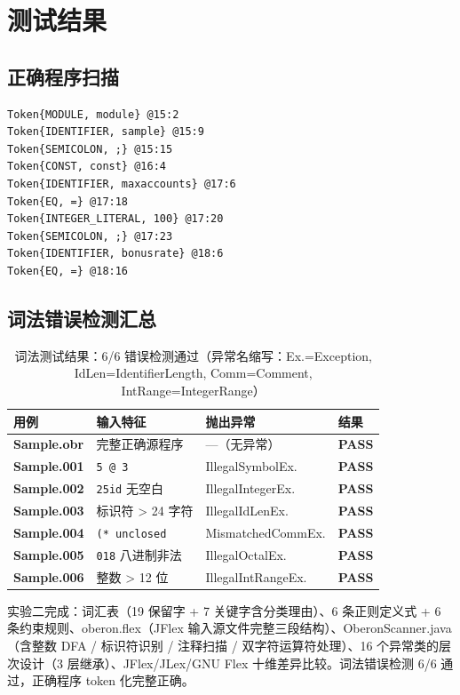 \documentclass[12pt,a4paper,fontset=none]{ctexart}
\begin{document}
\section{测试结果}

\subsection{正确程序扫描}

\begin{lstlisting}[style=labcode,caption={Sample.obr 扫描输出（前 10 行）}]
Token{MODULE, module} @15:2
Token{IDENTIFIER, sample} @15:9
Token{SEMICOLON, ;} @15:15
Token{CONST, const} @16:4
Token{IDENTIFIER, maxaccounts} @17:6
Token{EQ, =} @17:18
Token{INTEGER_LITERAL, 100} @17:20
Token{SEMICOLON, ;} @17:23
Token{IDENTIFIER, bonusrate} @18:6
Token{EQ, =} @18:16
\end{lstlisting}

\subsection{词法错误检测汇总}

\begin{table}[H]\centering
\scriptsize
\setlength{\tabcolsep}{3pt}
\begin{tabularx}{\textwidth}{>{\bfseries}P{1.4cm}>{\raggedright\arraybackslash}X>{\raggedright\arraybackslash}X>{\bfseries}P{1cm}}
\toprule
用例 & 输入特征 & 抛出异常 & 结果 \\
\midrule
Sample.obr & 完整正确源程序 & —（无异常） & PASS \\
Sample.001 & \texttt{5 @ 3} & IllegalSymbolEx. & PASS \\
Sample.002 & \texttt{25id} 无空白 & IllegalIntegerEx. & PASS \\
Sample.003 & 标识符 > 24 字符 & IllegalIdLenEx. & PASS \\
Sample.004 & \texttt{(* unclosed} & MismatchedCommEx. & PASS \\
Sample.005 & \texttt{018} 八进制非法 & IllegalOctalEx. & PASS \\
Sample.006 & 整数 > 12 位 & IllegalIntRangeEx. & PASS \\
\bottomrule
\end{tabularx}
\caption{词法测试结果：6/6 错误检测通过（异常名缩写：Ex.=Exception, IdLen=IdentifierLength, Comm=Comment, IntRange=IntegerRange）}
\label{tab:results}
\end{table}

\begin{summaryBox}
实验二完成：词汇表（19 保留字 + 7 关键字含分类理由）、6 条正则定义式 + 6 条约束规则、oberon.flex（JFlex 输入源文件完整三段结构）、OberonScanner.java（含整数 DFA / 标识符识别 / 注释扫描 / 双字符运算符处理）、16 个异常类的层次设计（3 层继承）、JFlex/JLex/GNU Flex 十维差异比较。词法错误检测 6/6 通过，正确程序 token 化完整正确。
\end{summaryBox}
\end{document}
